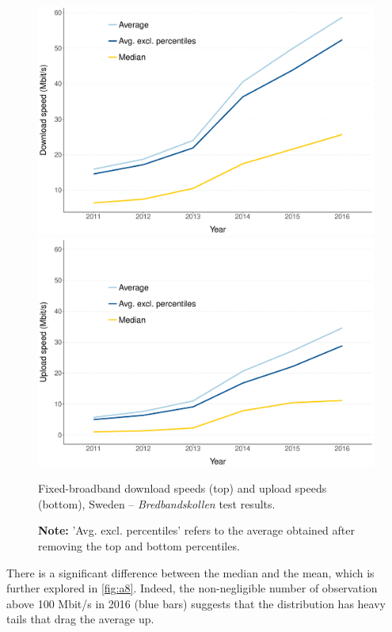 \documentclass[12pt]{article}
\begin{document}
\begin{figure}[H]
   \begin{minipage}{0.8\textwidth}
        \centering
        \includegraphics[width=\textwidth]{download_speeds.pdf} 
		
		\vspace{1cm}
		        
        \includegraphics[width=\textwidth]{upload_speeds.pdf}
    \end{minipage}
        \caption{Fixed-broadband download speeds (top) and upload speeds (bottom), Sweden -- \textit{Bredbandskollen} test results.}
        \caption*{\textbf{Note:} 'Avg. excl. percentiles' refers to the average obtained after removing the top and bottom percentiles.}
        \label{fig:a7}
\end{figure}   

There is a significant difference between the median and the mean, which is further explored in \autoref{fig:a8}. Indeed, the non-negligible number of observation above 100 Mbit/s in 2016 (blue bars) suggests that the distribution has heavy tails that drag the average up.
\end{document}
